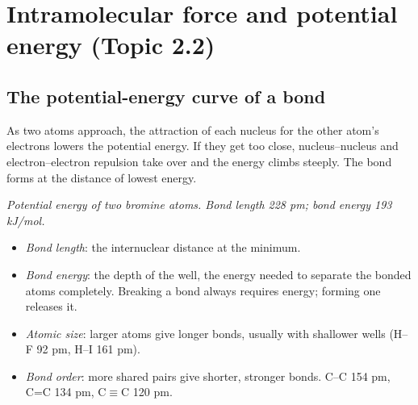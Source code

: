 \documentclass[11pt]{article}
\begin{document}
\section{Intramolecular force and potential energy (Topic 2.2)}\label{t:2.2}
\subsection{The potential-energy curve of a bond}
As two atoms approach, the attraction of each nucleus for the other atom's electrons lowers the potential energy. If they get too close, nucleus--nucleus and electron--electron repulsion take over and the energy climbs steeply. The bond forms at the distance of lowest energy.

\begin{center}

{\small\itshape Potential energy of two bromine atoms. Bond length 228 pm; bond energy 193 kJ/mol.}
\end{center}
\begin{itemize}
\item \emph{Bond length}: the internuclear distance at the minimum.
\item \emph{Bond energy}: the depth of the well, the energy needed to separate the bonded atoms completely. Breaking a bond always requires energy; forming one releases it.
\item \emph{Atomic size}: larger atoms give longer bonds, usually with shallower wells (H--F 92 pm, H--I 161 pm).
\item \emph{Bond order}: more shared pairs give shorter, stronger bonds. C--C 154 pm, C=C 134 pm, C$\equiv$C 120 pm.
\end{itemize}
\end{document}

